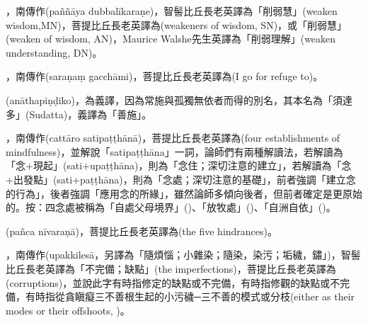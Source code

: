 \startitemgroup[noteitems]
\item{}，南傳作(paññāya dubbalīkaraṇe)，智髻比丘長老英譯為「削弱慧」(weaken wisdom,MN)，菩提比丘長老英譯為(weakeners of wisdom, SN)，或「削弱慧」(weaken of wisdom, AN)，Maurice Walshe先生英譯為「削弱理解」(weaken understanding, DN)。
\stopitemgroup

\startitemgroup[noteitems]
\item{}，南傳作(saraṇaṃ gacchāmi)，菩提比丘長老英譯為(I go for refuge to)。
\stopitemgroup

\startitemgroup[noteitems]
\item{}(anāthapiṇḍiko)，為義譯，因為常施與孤獨無依者而得的別名，其本名為「須達多」(Sudatta)，義譯為「善施」。
\stopitemgroup

\startitemgroup[noteitems]
\item{}，南傳作(cattāro satipaṭṭhānā)，菩提比丘長老英譯為(four establishments of mindfulness)，並解說「satipaṭṭhāna」一詞，論師們有兩種解讀法，若解讀為「念+現起」(sati+upaṭṭhāna)，則為「念住；深切注意的建立」，若解讀為「念+出發點」(sati+paṭṭhāna)，則為「念處；深切注意的基礎」，前者強調「建立念的行為」，後者強調「應用念的所緣」，雖然論師多傾向後者，但前者確定是更原始的。按：四念處被稱為「自處父母境界」()、「放牧處」()、「自洲自依」()。
\stopitemgroup

\startitemgroup[noteitems]
\item{}(pañca nīvaraṇā)，菩提比丘長老英譯為(the five hindrances)。
\stopitemgroup

\startitemgroup[noteitems]
\item{}，南傳作(upakkilesā，另譯為「隨煩惱；小雜染；隨染，染污；垢穢，鏽」)，智髻比丘長老英譯為「不完備；缺點」(the imperfections)，菩提比丘長老英譯為(corruptions)，並說此字有時指修定的缺點或不完備，有時指修觀的缺點或不完備，有時指從貪瞋癡三不善根生起的小污穢─三不善的模式或分枝(either as their modes or their offshoots, )。
\stopitemgroup

